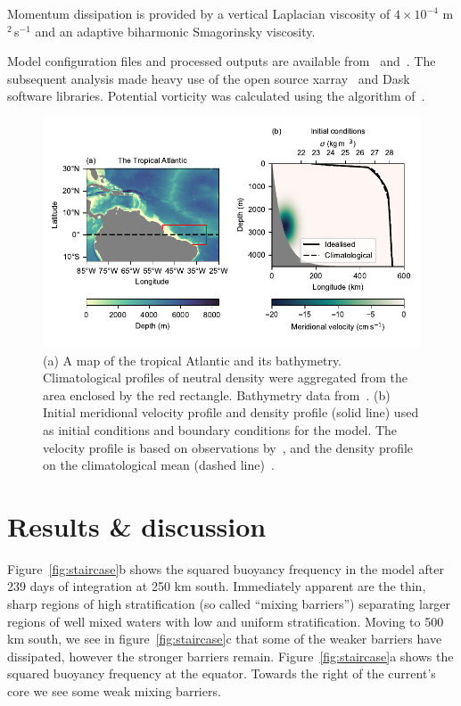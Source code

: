 Momentum dissipation is provided by a vertical Laplacian viscosity of $4 \times 10^{-4}$ m$^{2}$\,s$^{-1}$ and an adaptive biharmonic Smagorinsky viscosity.

Model configuration files and processed outputs are available from~\citet{code} and~\citet{data}. The subsequent analysis made heavy use of the open source xarray~\cite{xarray} and Dask~\cite{Dask} software libraries. Potential vorticity was calculated using the algorithm of~\citet{Morel2019}.

\begin{figure}[h]
    \centering
    \includegraphics[width=\textwidth]{../figures/Figure1.pdf}
    \caption{(a) A map of the tropical Atlantic and its bathymetry. Climatological profiles of neutral density were aggregated from the area enclosed by the red rectangle. Bathymetry data from~\citet{GEBCO2020}. (b) Initial meridional velocity profile and density profile (solid line) used as initial conditions and boundary conditions for the model. The velocity profile is based on observations by~\citet{Schott2005}, and the density profile on the climatological mean (dashed line)~\citep{WOA2018}.}
    \label{fig:fig1}
\end{figure}

\section{Results \& discussion}
\label{sec:randd}
Figure~\ref{fig:staircase}b shows the squared buoyancy frequency in the model after 239 days of integration at 250 km south. Immediately apparent are the thin, sharp regions of high stratification (so called ``mixing barriers'') separating larger regions of well mixed waters with low and uniform stratification. Moving to 500 km south, we see in figure~\ref{fig:staircase}c that some of the weaker barriers have dissipated, however the stronger barriers remain. Figure~\ref{fig:staircase}a shows the squared buoyancy frequency at the equator. Towards the right of the current's core we  see some weak mixing barriers.

